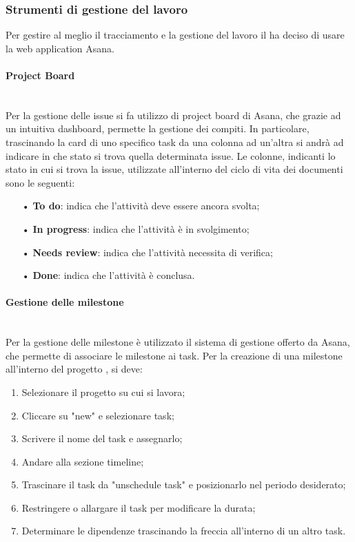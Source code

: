 \subsubsection{Strumenti di gestione del lavoro}\mbox{}
    Per gestire al meglio il tracciamento e la gestione del lavoro il \Gruppo \space ha deciso di usare la web application Asana. 

\paragraph{Project Board}\mbox{}\\
    \label{sec:projectboard}
    Per la gestione delle {issue} si fa utilizzo di {project board} di Asana, che grazie ad un intuitiva dashboard, permette
    la gestione dei compiti. In particolare, trascinando la {card} di uno specifico task da una colonna ad un'altra si andrà ad 
    indicare in che stato si trova quella determinata issue.
    Le colonne, indicanti lo stato in cui si trova la issue, utilizzate all'interno del ciclo di vita dei 
    documenti sono le seguenti:
    \begin{itemize}
    \item[•] \textbf{To do}: indica che l'attività deve essere ancora svolta;
    \item[•] \textbf{In progress}: indica che l'attività è in svolgimento;
    \item[•] \textbf{Needs review}: indica che l'attività necessita di verifica;
    \item[•] \textbf{Done}: indica che l'attività è conclusa.
    \end{itemize}

    \paragraph{Gestione delle milestone}\mbox{}\\
    Per la gestione delle {milestone} è utilizzato il sistema di gestione offerto da Asana, che permette di associare le 
    milestone ai task.
    Per la creazione di una milestone all'interno del progetto \NomeProgetto, si deve:
    \begin{enumerate}
    \item Selezionare il progetto su cui si lavora;
    \item Cliccare su "new" e selezionare task;
    \item Scrivere il nome del task e assegnarlo;
    \item Andare alla sezione timeline;
    \item Trascinare il task da "unschedule task" e posizionarlo nel periodo desiderato;
    \item Restringere o allargare il task per modificare la durata; 
    \item Determinare le dipendenze trascinando la freccia all'interno di un altro task.
    \end{enumerate}

